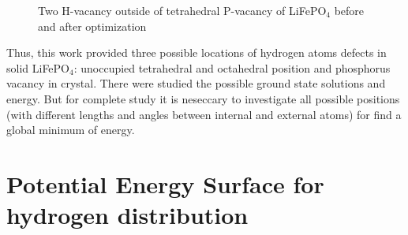 \begin{figure}[h]
\begin{minipage}[h]{0.48\linewidth}
\end{minipage}
\hfill
\begin{minipage}[h]{0.48\linewidth}
\end{minipage}
\caption{Two H-vacancy  outside of tetrahedral P-vacancy of LiFePO$_4$ before and after optimization}
\label{h31}
\end{figure}

Thus, this work provided three possible locations of hydrogen atoms defects in solid LiFePO$_4$: unoccupied tetrahedral and octahedral position and phosphorus vacancy in crystal. There were studied the possible ground state solutions and energy. But for complete study it is neseccary to investigate all possible positions (with different lengths and angles between internal and external atoms) for find a global minimum of energy.

\newpage

\section{Potential Energy Surface for hydrogen distribution}

